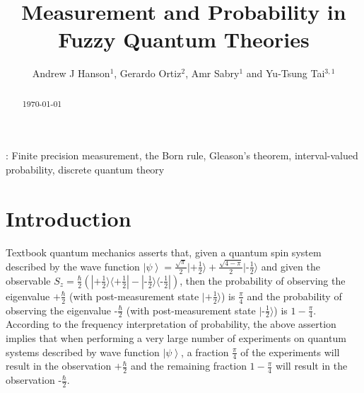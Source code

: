 \documentclass[12pt]{iopart}
\theoremstyle{plain}
\theoremstyle{definition}
\newcommand{\ket}[1]{{\left\vert{#1}\right\rangle}}
\newcommand{\fket}[1]{{|#1\rangle}}
\newcommand{\fproj}[1]{|#1\rangle\langle #1|}
\newcommand{\ps}{\texttt{+}}
\newcommand{\minus}{\texttt{-}}
\begin{document}
\title{Measurement and Probability in Fuzzy Quantum
Theories}

\author{Andrew J Hanson$^{1}$, Gerardo Ortiz$^{2}$,
Amr Sabry$^{1}$ and Yu-Tsung Tai$^{3,1}$}
\address{$^{1}$ School of Informatics and Computing, Indiana
University, Bloomington, IN 47405, USA}
\address{$^{2}$ Department of Physics, Indiana University, Bloomington, IN
47405, USA}
\address{$^{3}$ Department of Mathematics, Indiana University, Bloomington,
IN 47405, USA}
\begin{abstract}
\today
\end{abstract}
: {Finite precision measurement, the Born rule, Gleason's theorem, interval-valued
probability, discrete quantum theory}

\submitto{\jpa}

\section{Introduction}

Textbook quantum mechanics asserts that, given a quantum spin system
described by the wave function
$\ket{\psi}=\frac{\sqrt{\pi}}{2}\fket{\ps\frac{1}{2}}+\frac{\sqrt{4-\pi}}{2}\fket{\minus\frac{1}{2}}$
and given the observable
$S_z =
\frac{\hbar}{2}(\fproj{\ps\frac{1}{2}}-\fproj{\minus\frac{1}{2}})$,
then the probability of observing the eigenvalue $\ps\frac{\hbar}{2}$
(with post-measurement state $\fket{\ps\frac{1}{2}}$) is
$\frac{\pi}{4}$ and the probability of observing the eigenvalue
$\minus\frac{\hbar}{2}$ (with post-measurement state
$\fket{\minus\frac{1}{2}}$) is $1-\frac{\pi}{4}$. According to the
frequency interpretation of probability, the above assertion implies
that when performing a very large number of experiments on quantum
systems described by wave function $\ket{\psi}$, a fraction
$\frac{\pi}{4}$ of the experiments will result in the observation
$\ps\frac{\hbar}{2}$ and the remaining fraction $1-\frac{\pi}{4}$ will
result in the observation $\minus\frac{\hbar}{2}$.
\end{document}
